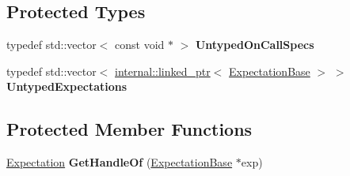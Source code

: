 \subsection*{Protected Types}
\begin{DoxyCompactItemize}
\item 
\mbox{\label{classtesting_1_1internal_1_1_untyped_function_mocker_base_a29cc87ed60ad0218432aa777abba7dbb}} 
typedef std\+::vector$<$ const void $\ast$ $>$ {\bfseries Untyped\+On\+Call\+Specs}
\item 
\mbox{\label{classtesting_1_1internal_1_1_untyped_function_mocker_base_a36480bd395e110b4eae5b0d0402de966}} 
typedef std\+::vector$<$ \hyperlink{classtesting_1_1internal_1_1linked__ptr}{internal\+::linked\+\_\+ptr}$<$ \hyperlink{classtesting_1_1internal_1_1_expectation_base}{Expectation\+Base} $>$ $>$ {\bfseries Untyped\+Expectations}
\end{DoxyCompactItemize}
\subsection*{Protected Member Functions}
\begin{DoxyCompactItemize}
\item 
\mbox{\label{classtesting_1_1internal_1_1_untyped_function_mocker_base_a7705611c4a63df16cddb0674878c403a}} 
\hyperlink{classtesting_1_1_expectation}{Expectation} {\bfseries Get\+Handle\+Of} (\hyperlink{classtesting_1_1internal_1_1_expectation_base}{Expectation\+Base} $\ast$exp)
\end{DoxyCompactItemize}
